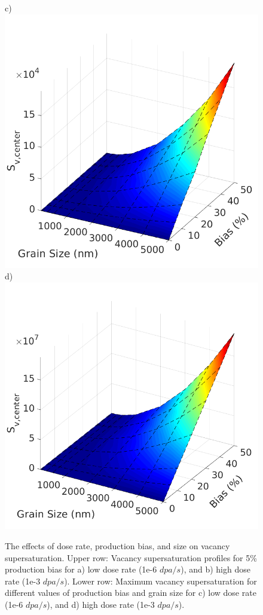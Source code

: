 \documentclass[utf8]{frontiersSCNS} %
\begin{document}
\begin{figure}[h!]
        c)\includegraphics[scale=0.35]{Fig7_c}
        d)\includegraphics[scale=0.35]{Fig7_d}
        \caption{The effects of dose rate, production bias, and size on vacancy supersaturation. Upper row: Vacancy supersaturation profiles for 5\% production bias for a) low dose rate (1e-6 $dpa/s$), and b) high dose rate (1e-3 $dpa/s$). Lower row: Maximum vacancy supersaturation for different values of production bias and grain size for c) low dose rate (1e-6 $dpa/s$), and d) high dose rate (1e-3 $dpa/s$). }
        \label{figure:vacancy_supersaturation_neutron}
    \end{figure}
    
\end{document}
